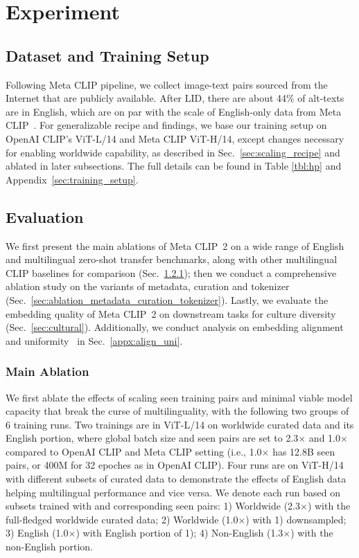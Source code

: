 \section{Experiment}
\label{sec:experiment}

\subsection{Dataset and Training Setup}
Following Meta CLIP pipeline, we collect image-text pairs sourced from the Internet that are publicly available.
After LID, there are about 44\% of alt-texts are in English, which are on par with the scale of English-only data from Meta CLIP~\citep{xu2024demystifying}. 
For generalizable recipe and findings, we base our training setup on OpenAI CLIP's ViT-L/14 and Meta CLIP ViT-H/14, except changes necessary for enabling worldwide capability, as described in Sec.~\ref{sec:scaling_recipe} and ablated in later subsections. The full details can be found in Table \ref{tbl:hp} and Appendix~\ref{sec:training_setup}.

\subsection{Evaluation}
\label{sec:main}

We first present the main ablations of Meta CLIP~2 on a wide range of English and multilingual zero-shot transfer benchmarks, along with other multilingual CLIP baselines for comparison (Sec.~\ref{sec:main_ablation}); then 
we conduct a comprehensive ablation study on the variants of metadata, curation and tokenizer (Sec.~\ref{sec:ablation_metadata_curation_tokenizer}).
Lastly, we evaluate the embedding quality of Meta CLIP~2 on downstream tasks for culture diversity (Sec.~\ref{sec:cultural}).
Additionally, we conduct analysis on embedding alignment and uniformity~\citep{wang2020hypersphere} in Sec.~\ref{appx:align_uni}.

\subsubsection{Main Ablation}
\label{sec:main_ablation}
We first ablate the effects of scaling seen training pairs and minimal viable model capacity that break the curse of multilinguality, 
with the following two groups of 6 training runs. Two trainings are in ViT-L/14 on worldwide curated data and its English portion, where global batch size and seen pairs are set to 2.3$\times$ and 1.0$\times$ compared to OpenAI CLIP and Meta CLIP setting (i.e., 1.0$\times$ has 12.8B seen pairs, or 400M for 32 epoches as in OpenAI CLIP). Four runs are on ViT-H/14 with different subsets of curated data to demonstrate the effects of English data helping multilingual performance and vice versa. We denote each run based on subsets trained with and corresponding seen pairs: 1) Worldwide (2.3$\times$) with the full-fledged worldwide curated data; 2) Worldwide (1.0$\times$) with 1) downsampled; 3) English (1.0$\times$) with English portion of 1); 4) Non-English (1.3$\times$) with the non-English portion.

